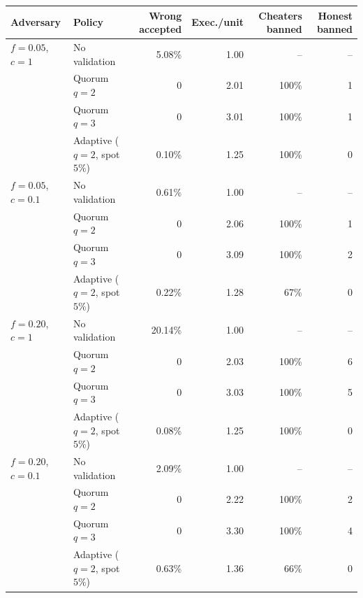 \begin{tabular}{llrrrr}
\toprule
\textbf{Adversary} & \textbf{Policy} & \textbf{Wrong accepted} & \textbf{Exec./unit} & \textbf{Cheaters banned} & \textbf{Honest banned} \\
\midrule
$f=0.05$, $c=1$ & No validation & 5.08\% & 1.00 & -- & -- \\
 & Quorum $q{=}2$ & 0 & 2.01 & 100\% & 1 \\
 & Quorum $q{=}3$ & 0 & 3.01 & 100\% & 1 \\
 & Adaptive ($q{=}2$, spot $5\%$) & 0.10\% & 1.25 & 100\% & 0 \\
\midrule
$f=0.05$, $c=0.1$ & No validation & 0.61\% & 1.00 & -- & -- \\
 & Quorum $q{=}2$ & 0 & 2.06 & 100\% & 1 \\
 & Quorum $q{=}3$ & 0 & 3.09 & 100\% & 2 \\
 & Adaptive ($q{=}2$, spot $5\%$) & 0.22\% & 1.28 & 67\% & 0 \\
\midrule
$f=0.20$, $c=1$ & No validation & 20.14\% & 1.00 & -- & -- \\
 & Quorum $q{=}2$ & 0 & 2.03 & 100\% & 6 \\
 & Quorum $q{=}3$ & 0 & 3.03 & 100\% & 5 \\
 & Adaptive ($q{=}2$, spot $5\%$) & 0.08\% & 1.25 & 100\% & 0 \\
\midrule
$f=0.20$, $c=0.1$ & No validation & 2.09\% & 1.00 & -- & -- \\
 & Quorum $q{=}2$ & 0 & 2.22 & 100\% & 2 \\
 & Quorum $q{=}3$ & 0 & 3.30 & 100\% & 4 \\
 & Adaptive ($q{=}2$, spot $5\%$) & 0.63\% & 1.36 & 66\% & 0 \\
\bottomrule
\end{tabular}
